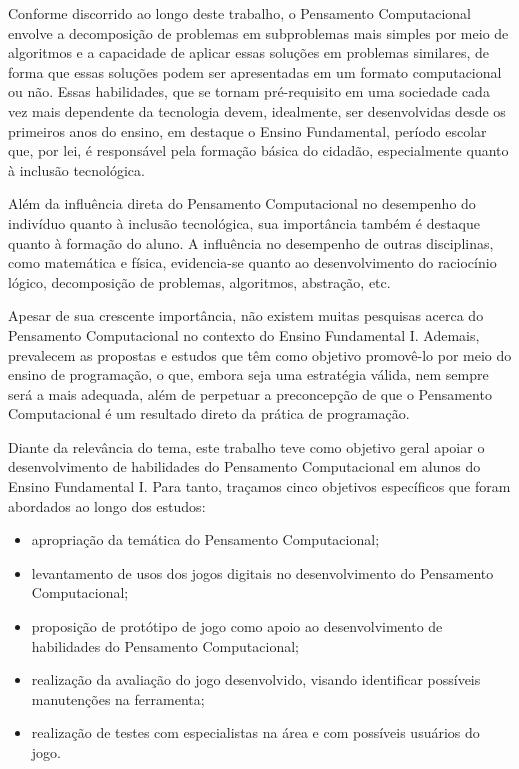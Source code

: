 Conforme discorrido ao longo deste trabalho, o Pensamento Computacional envolve a decomposição de problemas em subproblemas mais simples por meio de algoritmos e a capacidade de aplicar essas soluções em problemas similares, de forma que essas soluções podem ser apresentadas em um formato computacional ou não. Essas habilidades, que se tornam pré-requisito em uma sociedade cada vez mais dependente da tecnologia devem, idealmente, ser desenvolvidas desde os primeiros anos do ensino, em destaque o Ensino Fundamental, período escolar que, por lei, é responsável pela formação básica do cidadão, especialmente quanto à inclusão tecnológica.

Além da influência direta do Pensamento Computacional no desempenho do indivíduo quanto à inclusão tecnológica, sua importância também é destaque quanto à formação do aluno. A influência no desempenho de outras disciplinas, como matemática e física, evidencia-se quanto ao desenvolvimento do raciocínio lógico, decomposição de problemas, algoritmos, abstração, etc.

Apesar de sua crescente importância, não existem muitas pesquisas acerca do Pensamento Computacional no contexto do Ensino Fundamental I. Ademais, prevalecem as propostas e estudos que têm como objetivo promovê-lo por meio do ensino de programação, o que, embora seja uma estratégia válida, nem sempre será a mais adequada, além de perpetuar a preconcepção de que o Pensamento Computacional é um resultado direto da prática de programação. 

Diante da relevância do tema, este trabalho teve como objetivo geral apoiar o desenvolvimento de habilidades do Pensamento Computacional em alunos do Ensino Fundamental I. Para tanto, traçamos cinco objetivos específicos que foram abordados ao longo dos estudos: 

\begin{itemize}
	\item apropriação da temática do Pensamento Computacional;
	\item levantamento de usos dos jogos digitais no desenvolvimento do Pensamento Computacional;
	\item proposição de protótipo de jogo como apoio ao desenvolvimento de habilidades do Pensamento Computacional;
	\item realização da avaliação do jogo desenvolvido, visando identificar possíveis manutenções na ferramenta;
	\item realização de testes com especialistas na área e com possíveis usuários do jogo.
\end{itemize}

